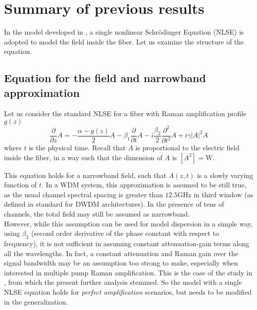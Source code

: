 \documentclass[10pt, lettersize, journal, onecolumn]{IEEEtran}
\begin{document}

\section{Summary of previous results}\label{previous}
In the model developed in \cite{Dar_2013}, a single nonlinear Schrödinger Equation (NLSE) is adopted to model the field inside the fiber. Let us examine the structure of the equation.
\subsection{Equation for the field and narrowband approximation}
    Let us consider the standard NLSE for a fiber with Raman amplification profile $g(z)$
    \begin{equation}\label{eq:nlse}
        \frac{\partial}{\partial z} A = -\frac{\alpha - g(z)}{2}A - \beta_1 \frac{\partial}{\partial t} A - i \frac{\beta_2}{2} \frac{\partial^2}{\partial t^2} A + i \gamma |A|^2 A
    \end{equation}
    where $t$ is the physical time. Recall that $A$ is proportional to the electric field inside the fiber, in a way such that the dimension of $A$ is $[A^2] = \text{W}$.

    This equation holds for a narrowband field, such that $A(z, t)$ is a slowly varying function of $t$.
    In a WDM system, this approximation is assumed to be still true, as the usual channel spectral spacing is greater than $12.5$GHz  in third window (as defined in standard \cite{ITU-T} for DWDM architectures). In the presence of tens of channels, the total field may still be assumed as narrowband. \\
	However, while this assumption can be used for model dispersion in a simple way, using $\beta_2$ (second order derivative of the phase constant with respect to frequency), it is not sufficient in assuming constant attenuation-gain terms along all the wavelengths. In fact, a constant attenuation and Raman gain over the signal bandwidth may be an assumption too strong to make, especially when interested in multiple pump Raman amplification. This is the case of the study in \cite{Marcon_2021}, from which the present further analysis stemmed.
	So the model with a single NLSE equation holds for \textit{perfect amplification} scenarios, but needs to be modified in the generalization.
   
\end{document}
